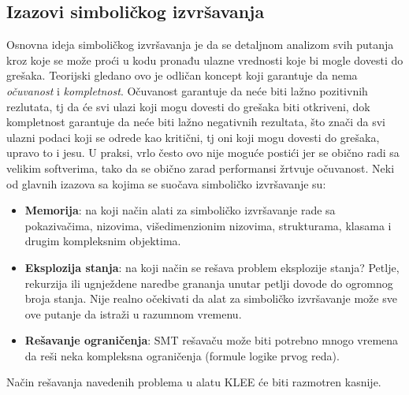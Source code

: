 \documentclass[12pt]{article}
\begin{document}
\subsection{Izazovi simboličkog izvršavanja}

Osnovna ideja simboličkog izvršavanja je da se detaljnom analizom svih putanja kroz koje se može proći u kodu pronađu ulazne vrednosti koje bi mogle dovesti do grešaka. Teorijski gledano ovo je odličan koncept koji garantuje da nema \textit{očuvanost} i \textit{kompletnost}. Očuvanost garantuje da neće biti lažno pozitivnih rezlutata, tj da će svi ulazi koji mogu dovesti do grešaka biti otkriveni, dok kompletnost garantuje da neće biti lažno negativnih rezultata, što znači da svi ulazni podaci koji se odrede kao kritični, tj oni koji mogu dovesti do grešaka, upravo to i jesu. U praksi, vrlo često ovo nije moguće postići jer se obično radi sa velikim softverima, tako da se obično zarad performansi žrtvuje očuvanost. Neki od glavnih izazova sa kojima se suočava simboličko izvršavanje su: 

\begin{itemize}
    \item \textbf{Memorija}: na koji način alati za simboličko izvršavanje rade sa pokazivačima, nizovima, višedimenzionim nizovima, strukturama, klasama i drugim kompleksnim objektima.
    
    \item \textbf{Eksplozija stanja}: na koji način se rešava problem eksplozije stanja? Petlje, rekurzija ili ugnježdene naredbe grananja unutar petlji dovode do ogromnog broja stanja. Nije realno očekivati da alat za simboličko izvršavanje može sve ove putanje da istraži u razumnom vremenu.
    
    \item \textbf{Rešavanje ograničenja}: SMT rešavaču može biti potrebno mnogo vremena da reši neka kompleksna ograničenja (formule logike prvog reda).
\end{itemize}

Način rešavanja navedenih problema u alatu KLEE će biti razmotren kasnije.
\end{document}

